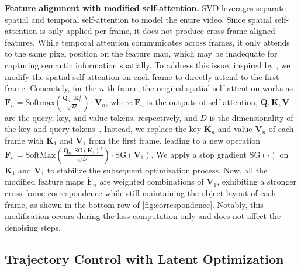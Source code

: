 \textbf{Feature alignment with modified self-attention.} 
SVD leverages separate spatial and temporal self-attention to model the entire video.
Since spatial self-attention is only applied per frame, it does not produce cross-frame aligned features.
While temporal attention communicates across frames, it only attends to the same pixel position on the feature map, which may be inadequate for capturing semantic information spatially. %
To address this issue, inspired by \citep{Tune-a-video}, we modify the spatial self-attention on each frame to directly attend to the first frame.
Concretely, for the $n$-th frame, the original spatial self-attention works as $\bm{F}_n = 
\mathrm{Softmax}(\frac{\bm{Q}_{n} \cdot \bm{K}_{n}^T}{\sqrt{D}})\cdot \bm{V}_{n}$, where $\bm{F}_n$ %
is the %
outputs of self-attention, $\bm{Q}, \bm{K}, \bm{V}$ are the query, key, and value tokens, respectively, and $D$ is the dimensionality of the key and query tokens~\cite{Transformer}.
Instead, we replace the key $\bm{K}_{n}$ and value $\bm{V}_{n}$ of each frame with $\bm{K}_{1}$ and $\bm{V}_{1}$ from the first frame, leading to a new operation $\tilde{\bm{F}}_n = 
\mathrm{SoftMax}(\frac{\bm{Q}_{n} \cdot \mathrm{SG}(\bm{K}_{1})^T}{\sqrt{D}}) \cdot \mathrm{SG}(\bm{V}_{1})$.
We apply a stop gradient $\mathrm{SG}(\cdot)$ on $\bm{K}_{1}$ and $\bm{V}_{1}$ to stabilize the subsequent optimization process.
Now, all the modified %
feature maps $\tilde{\bm{F}}_n$ are weighted combinations of $\bm{V}_1$, exhibiting a stronger cross-frame correspondence while still maintaining the object layout of each frame, as shown in the bottom row of \cref{fig:correspondence}. Notably, this modification occurs during the loss computation only and does not affect the denoising steps.


\subsection{Trajectory Control with Latent Optimization}
\label{sec:motion_optimization}


